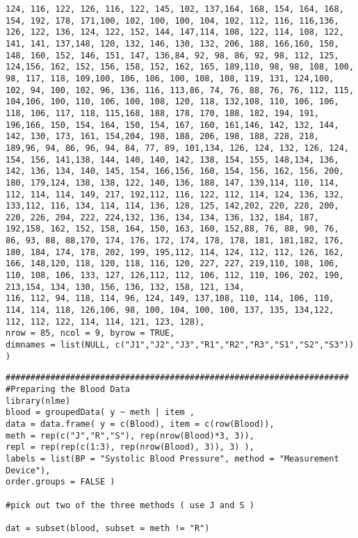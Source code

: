 \begin{verbatim}
124, 116, 122, 126, 116, 122, 145, 102, 137,164, 168, 154, 164, 168, 154, 192, 178, 171,100, 102, 100, 100, 104, 102, 112, 116, 116,136, 126, 122, 136, 124, 122, 152, 144, 147,114, 108, 122, 114, 108, 122, 141, 141, 137,148, 120, 132, 146, 130, 132, 206, 188, 166,160, 150, 148, 160, 152, 146, 151, 147, 136,84, 92, 98, 86, 92, 98, 112, 125, 124,156, 162, 152, 156, 158, 152, 162, 165, 189,110, 98, 98, 108, 100, 98, 117, 118, 109,100, 106, 106, 100, 108, 108, 119, 131, 124,100, 102, 94, 100, 102, 96, 136, 116, 113,86, 74, 76, 88, 76, 76, 112, 115, 104,106, 100, 110, 106, 100, 108, 120, 118, 132,108, 110, 106, 106, 118, 106, 117, 118, 115,168, 188, 178, 170, 188, 182, 194, 191, 196,166, 150, 154, 164, 150, 154, 167, 160, 161,146, 142, 132, 144, 142, 130, 173, 161, 154,204, 198, 188, 206, 198, 188, 228, 218, 189,96, 94, 86, 96, 94, 84, 77, 89, 101,134, 126, 124, 132, 126, 124, 154, 156, 141,138, 144, 140, 140, 142, 138, 154, 155, 148,134, 136, 142, 136, 134, 140, 145, 154, 166,156, 160, 154, 156, 162, 156, 200, 180, 179,124, 138, 138, 122, 140, 136, 188, 147, 139,114, 110, 114, 112, 114, 114, 149, 217, 192,112, 116, 122, 112, 114, 124, 136, 132, 133,112, 116, 134, 114, 114, 136, 128, 125, 142,202, 220, 228, 200, 220, 226, 204, 222, 224,132, 136, 134, 134, 136, 132, 184, 187, 192,158, 162, 152, 158, 164, 150, 163, 160, 152,88, 76, 88, 90, 76, 86, 93, 88, 88,170, 174, 176, 172, 174, 178, 178, 181, 181,182, 176, 180, 184, 174, 178, 202, 199, 195,112, 114, 124, 112, 112, 126, 162, 166, 148,120, 118, 120, 118, 116, 120, 227, 227, 219,110, 108, 106, 110, 108, 106, 133, 127, 126,112, 112, 106, 112, 110, 106, 202, 190, 213,154, 134, 130, 156, 136, 132, 158, 121, 134,
116, 112, 94, 118, 114, 96, 124, 149, 137,108, 110, 114, 106, 110, 114, 114, 118, 126,106, 98, 100, 104, 100, 100, 137, 135, 134,122, 112, 112, 122, 114, 114, 121, 123, 128), 
nrow = 85, ncol = 9, byrow = TRUE,
dimnames = list(NULL, c("J1","J2","J3","R1","R2","R3","S1","S2","S3")) )
\end{verbatim}

\begin{verbatim}
#####################################################################
#Preparing the Blood Data
library(nlme)
blood = groupedData( y ~ meth | item ,
data = data.frame( y = c(Blood), item = c(row(Blood)),
meth = rep(c("J","R","S"), rep(nrow(Blood)*3, 3)),
repl = rep(rep(c(1:3), rep(nrow(Blood), 3)), 3) ),
labels = list(BP = "Systolic Blood Pressure", method = "Measurement Device"),
order.groups = FALSE )

#pick out two of the three methods ( use J and S ) 

dat = subset(blood, subset = meth != "R")

\end{verbatim}

